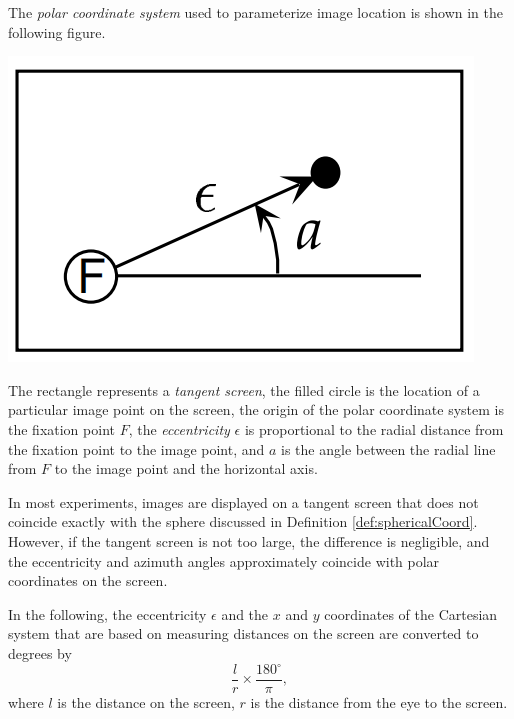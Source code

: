 \begin{defn}
  \label{defn:PolarCoord}
  The \emph{polar coordinate system} used to parameterize image location is shown in the following figure.
  \begin{center}
    \includegraphics[scale=0.15]{./png/polarCoord}
  \end{center}
  The rectangle represents a \emph{tangent screen}, the filled circle is the location of a particular image point on the screen, the origin of the polar coordinate system is the fixation point $F$, the \emph{eccentricity} $\epsilon$ is proportional to the radial distance from the fixation point to the image point, and $a$ is the angle between the radial line from $F$ to the image point and the horizontal axis.
\end{defn}

\begin{rem}
  In most experiments, images are displayed on a tangent screen that does not coincide exactly with the sphere discussed in Definition \ref{def:sphericalCoord}. However, if the tangent screen is not too large, the difference is negligible, and the eccentricity and azimuth angles approximately coincide with polar coordinates on the screen.
\end{rem}

\begin{asm}
  \label{asm:unit}
  In the following, the eccentricity $\epsilon$ and the $x$ and $y$ coordinates of the Cartesian system that are based on measuring distances on the screen are converted to degrees by
  \begin{equation}
    \label{equ:conversion}
    \frac{l}{r}\times\frac{180^{\circ}}{\pi},
  \end{equation}
  where $l$ is the distance on the screen, $r$ is the distance from the eye to the screen.
\end{asm}

